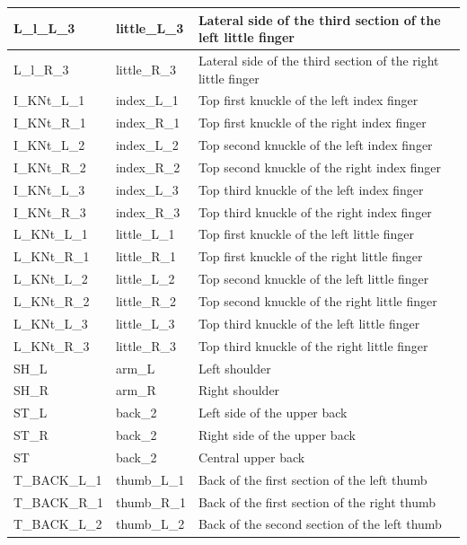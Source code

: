\documentclass[../main.tex]{subfiles}
\begin{document}
\begin{longtable}{|p{2cm}|p{3cm}|p{5cm}|}
    L\_l\_L\_3 & little\_L\_3 & Lateral side of the third section of the left little finger \\ \hline
    L\_l\_R\_3 & little\_R\_3 & Lateral side of the third section of the right little finger \\ \hline
    I\_KNt\_L\_1 & index\_L\_1 & Top first knuckle of the left index finger \\ \hline
    I\_KNt\_R\_1 & index\_R\_1 & Top first knuckle of the right index finger \\ \hline
    I\_KNt\_L\_2 & index\_L\_2 & Top second knuckle of the left index finger \\ \hline
    I\_KNt\_R\_2 & index\_R\_2 & Top second knuckle of the right index finger \\ \hline
    I\_KNt\_L\_3 & index\_L\_3 & Top third knuckle of the left index finger \\ \hline
    I\_KNt\_R\_3 & index\_R\_3 & Top third knuckle of the right index finger \\ \hline
    L\_KNt\_L\_1 & little\_L\_1 & Top first knuckle of the left little finger \\ \hline
    L\_KNt\_R\_1 & little\_R\_1 & Top first knuckle of the right little finger \\ \hline
    L\_KNt\_L\_2 & little\_L\_2 & Top second knuckle of the left little finger \\ \hline
    L\_KNt\_R\_2 & little\_R\_2 & Top second knuckle of the right little finger \\ \hline
    L\_KNt\_L\_3 & little\_L\_3 & Top third knuckle of the left little finger \\ \hline
    L\_KNt\_R\_3 & little\_R\_3 & Top third knuckle of the right little finger \\ \hline
    SH\_L & arm\_L & Left shoulder \\ \hline
    SH\_R & arm\_R & Right shoulder \\ \hline
    ST\_L & back\_2 & Left side of the upper back \\ \hline
    ST\_R & back\_2 & Right side of the upper back \\ \hline
    ST & back\_2 & Central upper back \\ \hline
    T\_BACK\_L\_1 & thumb\_L\_1 & Back of the first section of the left thumb \\ \hline
    T\_BACK\_R\_1 & thumb\_R\_1 & Back of the first section of the right thumb \\ \hline
    T\_BACK\_L\_2 & thumb\_L\_2 & Back of the second section of the left thumb \\ \hline

\end{longtable}
\end{document}
